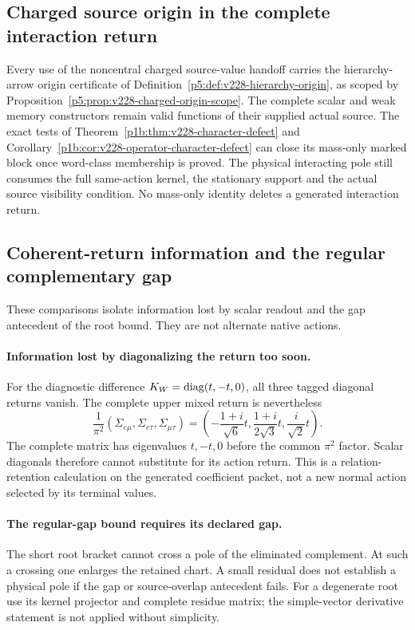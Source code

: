 \documentclass[12pt,a4paper]{article}
\begin{document}


\subsection{Charged source origin in the complete interaction return}
\label{p5c:sec:v228-source-origin}
Every use of the noncentral charged source-value handoff carries the
hierarchy-arrow origin certificate of
Definition~\ref{p5:def:v228-hierarchy-origin}, as scoped by
Proposition~\ref{p5:prop:v228-charged-origin-scope}.
The complete scalar and weak memory constructors remain valid functions
of their supplied actual source. The exact tests of
Theorem~\ref{p1b:thm:v228-character-defect} and
Corollary~\ref{p1b:cor:v228-operator-character-defect} can close its
mass-only marked block once word-class membership is proved.
The physical interacting pole still consumes the full same-action kernel,
the stationary support and the actual source visibility condition.
No mass-only identity deletes a generated interaction return.


\subsection{Coherent-return information and the regular complementary gap}
\label{p5c:app:v2168-weak-memory-diagnostics}
These comparisons isolate information lost by scalar readout and the
gap antecedent of the root bound. They are not alternate native actions.
\paragraph{Information lost by diagonalizing the return too soon.}
For the diagnostic difference $K_W=\operatorname{diag}(t,-t,0)$, all three tagged
diagonal returns vanish. The complete upper mixed return is nevertheless
\[
 \frac1{\pi^2}(\Sigma_{e\mu},\Sigma_{e\tau},\Sigma_{\mu\tau})
 =\left(-\frac{1+i}{\sqrt6}t,
          \frac{1+i}{2\sqrt3}t,\frac{i}{\sqrt2}t\right).
\]
The complete matrix has eigenvalues $t,-t,0$ before the common $\pi^2$
factor. Scalar diagonals therefore cannot substitute for its action return.
This is a relation-retention calculation on the generated coefficient packet,
not a new normal action selected by its terminal values.

\paragraph{The regular-gap bound requires its declared gap.}
The short root bracket cannot cross a pole of the eliminated complement.
At such a crossing one enlarges the retained chart. A small residual does
not establish a physical pole if the gap or source-overlap antecedent fails.
For a degenerate root use its kernel projector and complete residue matrix;
the simple-vector derivative statement is not applied without simplicity.
\end{document}
